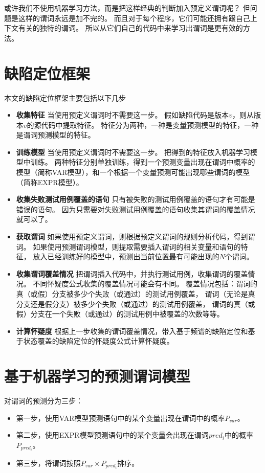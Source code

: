 或许我们不使用机器学习方法，而是把这样经典的判断加入预定义谓词呢？
但问题是这样的谓词永远是加不完的。
而且对于每个程序，它们可能还拥有跟自己上下文有关的独特的谓词。
所以从它们自己的代码中来学习出谓词是更有效的方法。

\section{缺陷定位框架}

本文的缺陷定位框架主要包括以下几步
\begin{itemize}
\item \textbf{收集特征} 
当使用预定义谓词时不需要这一步。
假如缺陷代码是版本$v$，则从版本$v$的源代码中提取特征。
特征分为两种，一种是变量预测模型的特征，一种是谓词预测模型的特征。
\item \textbf{训练模型}
当使用预定义谓词时不需要这一步。
把得到的特征放入机器学习模型中训练。
两种特征分别单独训练，得到一个预测变量出现在谓词中概率的模型（简称VAR模型），和一个根据一个变量预测可能出现哪些谓词的模型（简称EXPR模型）。
\item \textbf{收集失败测试用例覆盖的语句}
只有被失败的测试用例覆盖的语句才有可能是错误的语句。
因为只需要对失败测试用例覆盖的语句收集其谓词的覆盖情况就可以了。
\item \textbf{获取谓词}
如果使用预定义谓词，则根据预定义谓词的规则分析代码，得到谓词。
如果使用预测谓词模型，则提取需要插入谓词的相关变量和语句的特征，
放入已经训练好的模型中，预测出当前位置最有可能出现的$N$个谓词。
\item \textbf{收集谓词覆盖情况}
把谓词插入代码中，并执行测试用例，收集谓词的覆盖情况。
不同怀疑度公式收集的覆盖情况可能会有不同。
覆盖情况包括：谓词的真（或假）分支被多少个失败（或通过）的测试用例覆盖，
谓词（无论是真分支还是假分支）被多少个失败（或通过）的测试用例覆盖，
谓词的真（或假）分支在一个失败（或通过）的测试用例中被覆盖的次数等等。
\item \textbf{计算怀疑度}
根据上一步收集的谓词覆盖情况，带入基于频谱的缺陷定位和基于状态覆盖的缺陷定位的怀疑度公式计算怀疑度。
\end{itemize}

\section{基于机器学习的预测谓词模型}

对谓词的预测分为三步：
\begin{itemize}
\item 第一步，使用VAR模型预测语句中的某个变量出现在谓词中的概率$P_{var}$。
\item 第二步，使用EXPR模型预测语句中的某个变量会出现在谓词$pred_i$中的概率$P_{pred_i}$。
\item 第三步，将谓词按照$P_{var} \times P_{pred_i}$排序。
\end{itemize}

